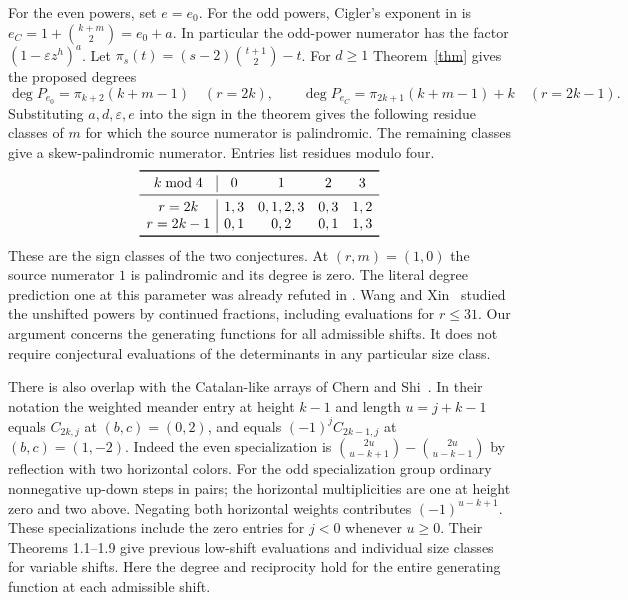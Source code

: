 \documentclass[11pt]{article}
\newcommand{\ee}{\varepsilon}
\DeclareMathOperator{\degop}{deg}
\begin{document}
For the even powers, set $e=e_0$. For the odd powers, Cigler's exponent in \cite[Conjectures 15--16, (28), (30)]{cigler} is $e_C=1+\binom{k+m}{2}=e_0+a$. In particular the odd-power numerator has the factor $(1-\ee z^h)^a$. Let \(\pi_s(t)=(s-2)\binom{t+1}{2}-t\). For $d\ge1$ Theorem~\ref{thm} gives the proposed degrees
\[
 \degop P_{e_0}=\pi_{k+2}(k+m-1)\quad(r=2k),\qquad
 \degop P_{e_C}=\pi_{2k+1}(k+m-1)+k\quad(r=2k-1).
\]
Substituting $a,d,\ee,e$ into the sign in the theorem gives the following residue classes of $m$ for which the source numerator is palindromic. The remaining classes give a skew-palindromic numerator. Entries list residues modulo four.
\[
\begin{array}{c|cccc}\toprule
 k\bmod4&0&1&2&3\\\midrule
 r=2k&1,3&0,1,2,3&0,3&1,2\\
 r=2k-1&0,1&0,2&0,1&1,3\\\bottomrule
\end{array}
\]
These are the sign classes of the two conjectures. At $(r,m)=(1,0)$ the source numerator $1$ is palindromic and its degree is zero. The literal degree prediction one at this parameter was already refuted in \cite{omega}. Wang and Xin~\cite{wang} studied the unshifted powers by continued fractions, including evaluations for $r\le31$. Our argument concerns the generating functions for all admissible shifts. It does not require conjectural evaluations of the determinants in any particular size class.

There is also overlap with the Catalan-like arrays of Chern and Shi~\cite{cs}. In their notation the weighted meander entry at height $k-1$ and length $u=j+k-1$ equals $C_{2k,j}$ at $(b,c)=(0,2)$, and equals $(-1)^j C_{2k-1,j}$ at $(b,c)=(1,-2)$. Indeed the even specialization is $\binom{2u}{u-k+1}-\binom{2u}{u-k-1}$ by reflection with two horizontal colors. For the odd specialization group ordinary nonnegative up-down steps in pairs; the horizontal multiplicities are one at height zero and two above. Negating both horizontal weights contributes $(-1)^{u-k+1}$. These specializations include the zero entries for $j<0$ whenever $u\ge0$. Their Theorems 1.1--1.9 give previous low-shift evaluations and individual size classes for variable shifts. Here the degree and reciprocity hold for the entire generating function at each admissible shift.
\end{document}
